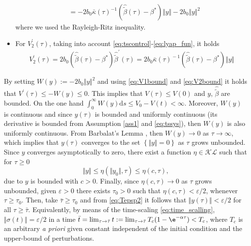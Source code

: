 \documentclass[twocolumn]{autart}    %
\begin{document}
\begin{itemize}
\begin{equation}
\begin{aligned}
&= -2b_0\bar{\kappa}(\tau)^{-1}(\hat{\tilde{\beta}}(\tau)-\beta^{*})\Vert {y} \Vert-2 b_0\Vert {y} \Vert ^2
\end{aligned}
\end{equation} where we used the Rayleigh-Ritz inequality.
\item For $V_2^{'}(\tau)$,  taking into account \eqref{eq:tscontrol}-\eqref{eq:lyap_fun},  it holds
\begin{equation}\label{eq:V2bound}
\begin{aligned}
V_2^{'}(\tau)\!=\!2b_0(\hat{\tilde{\beta}}(\tau)\!-\!\beta^{*})\hat{\tilde{\beta}}^{'}\!\!(\tau)\!=\!2b_0\bar{\kappa}(\tau)^{\!-\!1}\!(\hat{\tilde{\beta}}(\tau)\!-\!\beta^{*})\Vert {y} \Vert
\end{aligned}
\end{equation}
\end{itemize} \vspace{-10pt}By setting $W(y):=-2b_0\Vert y \Vert^2$ and using \eqref{eq:V1bound} and \eqref{eq:V2bound} it holds that $V^{'}(\tau)\leq -W(y)\leq 0$. This implies that $V(\tau)\leq V(0)$ and $y$, $\hat{\tilde{\beta}}$ are bounded.  On the one hand $\int_0^\infty W(y)\mathrm{d}s\leq V_0-V(t)<\infty$. Moreover, $W(y)$ is continuous and since $y(\tau)$ is bounded and uniformly continuous (its derivative is bounded from Assumption \ref{ass1} and \eqref{eq:tssys}), then $W(y)$ is also uniformly continuous. From Barbalat's Lemma \cite{khalil2001}, then $W(y)\rightarrow 0$ as $\tau \rightarrow \infty$, which implies that $y(\tau)$ converges to the set $\left\lbrace \Vert y \Vert=0 \right\rbrace$ as $\tau$ grows unbounded. Since $y$ converges asymptotically to zero, there exist a function $\eta \in \mathcal{KL}$ such that for $\tau\geq 0$
\begin{equation}\label{eq:Tepsp2}
\Vert y \Vert \leq \eta(\Vert y_0 \Vert,\tau)\leq \eta(c,\tau),
\end{equation} due to $y$ is bounded with $c>0$. Finally, since $\eta(c, \tau)\rightarrow 0$ as $\tau$ grows unbounded, given $\varepsilon>0$ there exists $\tau_0>0$ such that $\eta(c,\tau)< \varepsilon/2$,  whenever $\tau \geq \tau_0$. Then, take $\bar{\tau}\geq \tau_0$ and from \eqref{eq:Tepsp2} it follows that $\Vert y(\tau) \Vert < \varepsilon/2$ for all $\tau\geq \bar{\tau}$.  Equivalently, by means of the time-scaling \eqref{eq:time_scalling},  $\Vert \sigma(t) \Vert =\varepsilon/2$ in a time $\bar{t}=\lim_{\tau\rightarrow\bar{\tau}}t:=\lim_{\tau\rightarrow\bar{\tau}}T_c(1-\e^{-\alpha \tau})<T_c$, where $T_c$ is an arbitrary \textit{a priori} given constant independent of the initial condition and the upper-bound of perturbations.  \vspace{-10pt}
\end{document}

